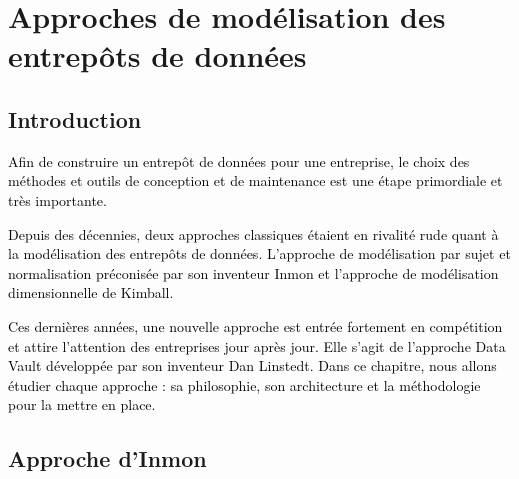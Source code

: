 \documentclass[a4paper,12pt]{report}
\begin{document}

























\chapter{Approches de modélisation des entrepôts de données}
\section*{Introduction}
\textcolor{black}{Afin de construire un entrepôt de données pour une entreprise, le choix des méthodes et outils de conception et de maintenance est une étape primordiale et très importante.}

\textcolor{black}{Depuis des décennies, deux approches classiques étaient en rivalité rude quant à la modélisation des entrepôts de données. L’approche de modélisation par sujet et normalisation préconisée par son inventeur Inmon et l’approche de modélisation dimensionnelle de Kimball.}

\textcolor{black}{Ces dernières années, une nouvelle approche est entrée fortement en compétition et attire l’attention des entreprises jour après jour. Elle s’agit de l’approche Data Vault développée par son inventeur Dan Linstedt.
Dans ce chapitre, nous allons étudier chaque approche : sa philosophie, son architecture et la méthodologie pour la mettre en place.}


\section{Approche d’Inmon}
\end{document}
